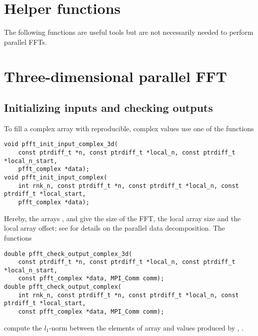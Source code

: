 \section{Helper functions}
The following functions are useful tools but are not necessarily needed to perform parallel FFTs.

\section{Three-dimensional parallel FFT}
\subsection{Initializing inputs and checking outputs}\label{sec:init-data-3d-c2c}
To fill a complex array  with reproducible, complex values use one of the functions
\begin{lstlisting}
void pfft_init_input_complex_3d(
    const ptrdiff_t *n, const ptrdiff_t *local_n, const ptrdiff_t *local_n_start,
    pfft_complex *data);
void pfft_init_input_complex(
    int rnk_n, const ptrdiff_t *n, const ptrdiff_t *local_n, const ptrdiff_t *local_start,
    pfft_complex *data);
\end{lstlisting}
Hereby, the arrays ,  and  give the size of the FFT, the local array size and the local array offset;
see \cite{sec:par-data-decomp} for details on the parallel data decomposition.
The functions
\begin{lstlisting}
double pfft_check_output_complex_3d(
    const ptrdiff_t *n, const ptrdiff_t *local_n, const ptrdiff_t *local_n_start,
    const pfft_complex *data, MPI_Comm comm);
double pfft_check_output_complex(
    int rnk_n, const ptrdiff_t *n, const ptrdiff_t *local_n, const ptrdiff_t *local_start,
    const pfft_complex *data, MPI_Comm comm);
\end{lstlisting}
compute the $l_1$-norm between the elements of array  and values produced by , .

